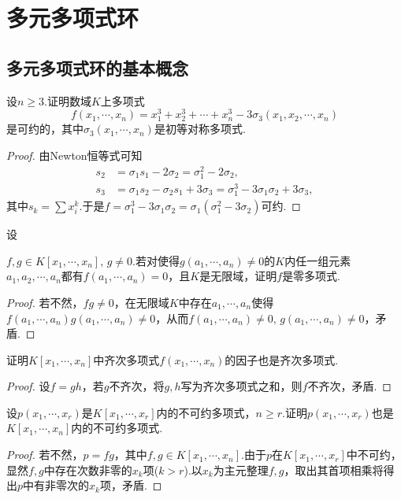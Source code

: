 \section{多元多项式环}
\subsection{多元多项式环的基本概念}
\begin{prob}[3]
	设$n\ge 3$.证明数域$K$上多项式
	\[
		f(x_1,\cdots,x_n)=x_1^3+x_2^3+\cdots+x_n^3-3\sigma_3(x_1,x_2,\cdots,x_n)
	\]
	是可约的，其中$\sigma_3(x_1,\cdots,x_n)$是初等对称多项式.
\end{prob}
\begin{proof}
	由Newton恒等式可知
	\begin{align*}
		s_2 & =\sigma_1s_1-2\sigma_2=\sigma_1^2-2\sigma_2,                               \\
		s_3 & =\sigma_1s_2-\sigma_2s_1+3\sigma_3=\sigma_1^3-3\sigma_1\sigma_2+3\sigma_3,
	\end{align*}
	其中$s_k=\sum x_i^k$.于是$f=\sigma_1^3-3\sigma_1\sigma_2=\sigma_1(\sigma_1^2-3\sigma_2)$可约.
\end{proof}
\begin{prob}[4]
	\hypertarget{ZeroPolynomialCriterion}{设}$f,g\in K[x_1,\cdots,x_n],\,g\ne 0$.若对使得$g(a_1,\cdots,a_n)\ne 0$的$K$内任一组元素$a_1,a_2,\cdots,a_n$都有$f(a_1,\cdots,a_n)=0$，且$K$是无限域，证明$f$是零多项式.
\end{prob}
\begin{proof}
	若不然，$fg\ne 0$，在无限域$K$中存在$a_1,\cdots,a_n$使得$f(a_1,\cdots,a_n)g(a_1,\cdots,a_n)\ne 0$，从而$f(a_1,\cdots,a_n)\ne 0,\,g(a_1,\cdots,a_n)\ne 0$，矛盾.
\end{proof}
\begin{prob}[5]
	证明$K[x_1,\cdots,x_n]$中齐次多项式$f(x_1,\cdots,x_n)$的因子也是齐次多项式.
\end{prob}
\begin{proof}
	设$f=gh$，若$g$不齐次，将$g,h$写为齐次多项式之和，则$f$不齐次，矛盾.
\end{proof}
\begin{prob}[6]
	设$p(x_1,\cdots,x_r)$是$K[x_1,\cdots,x_r]$内的不可约多项式，$n\ge r$.证明$p(x_1,\cdots,x_r)$也是$K[x_1,\cdots,x_n]$内的不可约多项式.
\end{prob}
\begin{proof}
	若不然，$p=fg$，其中$f,g\in K[x_1,\cdots,x_n]$.由于$p$在$K[x_1,\cdots,x_r]$中不可约，显然$f,g$中存在次数非零的$x_k$项($k>r$).以$x_k$为主元整理$f,g$，取出其首项相乘将得出$p$中有非零次的$x_k$项，矛盾.
\end{proof}
